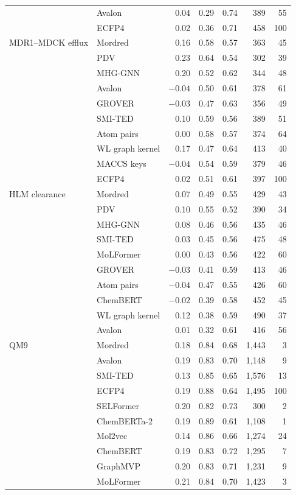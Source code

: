 \begin{longtable}{llrrrrr}
 & Avalon & 0.04 & 0.29 & 0.74 & 389 & 55 \\
 & ECFP4 & 0.02 & 0.36 & 0.71 & 458 & 100 \\
\midrule
MDR1--MDCK efflux & Mordred & 0.16 & 0.58 & 0.57 & 363 & 45 \\
 & PDV & 0.23 & 0.64 & 0.54 & 302 & 39 \\
 & MHG-GNN & 0.20 & 0.52 & 0.62 & 344 & 48 \\
 & Avalon & $-0.04$ & 0.50 & 0.61 & 378 & 61 \\
 & GROVER & $-0.03$ & 0.47 & 0.63 & 356 & 49 \\
 & SMI-TED & 0.10 & 0.59 & 0.56 & 389 & 51 \\
 & Atom pairs & 0.00 & 0.58 & 0.57 & 374 & 64 \\
 & WL graph kernel & 0.17 & 0.47 & 0.64 & 413 & 40 \\
 & MACCS keys & $-0.04$ & 0.54 & 0.59 & 379 & 46 \\
 & ECFP4 & 0.02 & 0.51 & 0.61 & 397 & 100 \\
\midrule
HLM clearance & Mordred & 0.07 & 0.49 & 0.55 & 429 & 43 \\
 & PDV & 0.10 & 0.55 & 0.52 & 390 & 34 \\
 & MHG-GNN & 0.08 & 0.46 & 0.56 & 435 & 46 \\
 & SMI-TED & 0.03 & 0.45 & 0.56 & 475 & 48 \\
 & MoLFormer & 0.00 & 0.43 & 0.56 & 422 & 60 \\
 & GROVER & $-0.03$ & 0.41 & 0.59 & 413 & 46 \\
 & Atom pairs & $-0.04$ & 0.47 & 0.55 & 426 & 60 \\
 & ChemBERT & $-0.02$ & 0.39 & 0.58 & 452 & 45 \\
 & WL graph kernel & 0.12 & 0.38 & 0.59 & 490 & 37 \\
 & Avalon & 0.01 & 0.32 & 0.61 & 416 & 56 \\
\midrule
QM9 & Mordred & 0.18 & 0.84 & 0.68 & 1,443 & 3 \\
 & Avalon & 0.19 & 0.83 & 0.70 & 1,148 & 9 \\
 & SMI-TED & 0.13 & 0.85 & 0.65 & 1,576 & 13 \\
 & ECFP4 & 0.19 & 0.88 & 0.64 & 1,495 & 100 \\
 & SELFormer & 0.20 & 0.82 & 0.73 & 300 & 2 \\
 & ChemBERTa-2 & 0.19 & 0.89 & 0.61 & 1,108 & 1 \\
 & Mol2vec & 0.14 & 0.86 & 0.66 & 1,274 & 24 \\
 & ChemBERT & 0.19 & 0.83 & 0.72 & 1,295 & 7 \\
 & GraphMVP & 0.20 & 0.83 & 0.71 & 1,231 & 9 \\
 & MoLFormer & 0.21 & 0.84 & 0.70 & 1,423 & 3 \\
\end{longtable}
